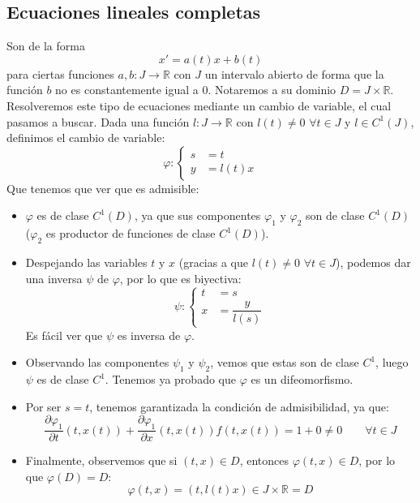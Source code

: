 \subsection{Ecuaciones lineales completas}
Son de la forma
\begin{equation}\label{eq:lineal_completa}
    x' = a(t)x + b(t)
\end{equation}
para ciertas funciones $a,b:J\rightarrow\mathbb{R}$ con $J$ un intervalo abierto de forma que la función $b$ no es constantemente igual a 0. Notaremos a su dominio $D = J\times \mathbb{R}$.\\

Resolveremos este tipo de ecuaciones mediante un cambio de variable, el cual pasamos a buscar. Dada una función $l:J\rightarrow\mathbb{R}$ con $l(t)\neq 0$ $\forall t\in J$ y $l \in C^1(J)$, definimos el cambio de variable:
\begin{equation*}
    \varphi: \left\{\begin{array}{rl}
            s &= t \\
            y &= l(t) x
    \end{array}\right.
\end{equation*}
Que tenemos que ver que es admisible:
\begin{itemize}
    \item $\varphi$ es de clase $C^1(D)$, ya que sus componentes $\varphi_1$ y $\varphi_2$ son de clase $C^1(D)$ ($\varphi_2$ es productor de funciones de clase $C^1(D)$).
    \item Despejando las variables $t$ y $x$ (gracias a que $l(t)\neq 0$ $\forall t\in J$), podemos dar una inversa $\psi$ de $\varphi$, por lo que es biyectiva:
        \begin{equation*}
            \psi: \left\{\begin{array}{rl}
                    t &= s \\
                    x &= \dfrac{y}{l(s)}
            \end{array}\right.
        \end{equation*}
        Es fácil ver que $\psi$ es inversa de $\varphi$.
    \item Observando las componentes $\psi_1$ y $\psi_2$, vemos que estas son de clase $C^1$, luego $\psi$ es de clase $C^1$. Tenemos ya probado que $\varphi$ es un difeomorfismo.
    \item Por ser $s = t$, tenemos garantizada la condición de admisibilidad, ya que:
        \begin{equation*}
            \dfrac{\partial\varphi_1}{\partial t}(t,x(t)) + \dfrac{\partial\varphi_1}{\partial x}(t,x(t)) f(t,x(t)) = 1 + 0 \neq 0 \qquad \forall t\in J
        \end{equation*}

    \item Finalmente, observemos que si $(t,x)\in D$, entonces $\varphi(t,x)\in D$, por lo que $\varphi(D) = D$:
        \begin{equation*}
            \varphi(t,x) = (t, l(t) x) \in J\times \mathbb{R} = D
        \end{equation*}
\end{itemize}
